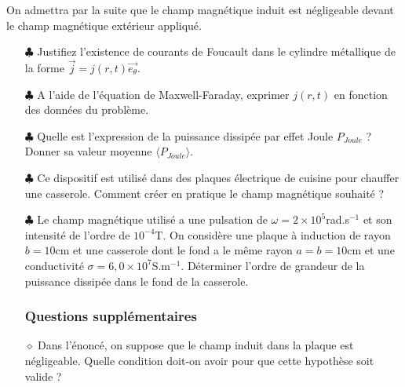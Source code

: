 \documentclass{report}
\begin{document}
On admettra par la suite que le champ magnétique induit est négligeable devant le champ magnétique extérieur appliqué. 

\begin{itemize}

	\item[$\clubsuit$] Justifiez l'existence de courants de Foucault dans le cylindre métallique de la forme $\vec{j}=j(r,t)\vec{e_\theta}$.
	
	\item[$\clubsuit$] A l'aide de l'équation de Maxwell-Faraday, exprimer $j(r,t)$ en fonction des données du problème.
	
	\item[$\clubsuit$] Quelle est l'expression de la puissance dissipée par effet Joule $P_{Joule}$ ? Donner sa valeur moyenne $\langle P_{Joule}\rangle$.
	
	\item[$\clubsuit$] Ce dispositif est utilisé dans des plaques électrique de cuisine pour chauffer une casserole. Comment créer en pratique le champ magnétique souhaité ?
	
	\item[$\clubsuit$] Le champ magnétique utilisé a une pulsation de $\omega=2\times10^{5}$rad.s$^{-1}$ et son intensité de l'ordre de $10^{-4}$T. On considère une plaque à induction de rayon $b=10$cm et une casserole dont le fond a le même rayon $a=b=10$cm et une conductivité $\sigma=6,0\times10^{7}$S.m$^{-1}$. Déterminer l'ordre de grandeur de la puissance dissipée dans le fond de la casserole. 

\subsubsection*{Questions supplémentaires}

	\item[$\diamond$] Dans l'énoncé, on suppose que le champ induit dans la plaque est négligeable. Quelle condition doit-on avoir pour que cette hypothèse soit valide ? %
	

\end{itemize}
\end{document}
